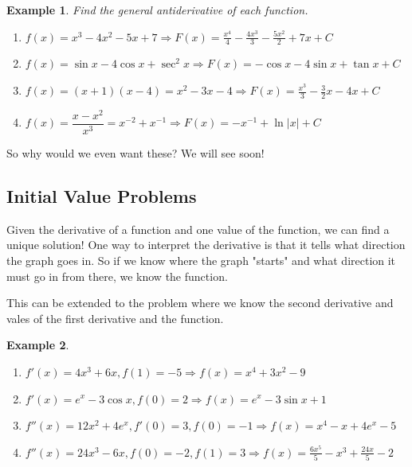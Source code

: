 \documentclass[letterpaper, 11pt, openany]{book}
\theoremstyle{mytheoremstyle}
\theoremstyle{myexamplestyle}
\newtheorem{example}{Example}[section]
\begin{document}
\begin{example}
    Find the general antiderivative of each function.
    \begin{enumerate}
        \item \(f(x) = x^3-4 x^2-5 x+7 \Rightarrow F(x) = \frac{x^4}{4}-\frac{4 x^3}{3}-\frac{5 x^2}{2}+7 x + C \)
        \item \(f(x) = \sin x - 4\cos x + \sec^2 x \Rightarrow F(x) = -\cos x - 4\sin x + \tan x + C\)
        \item \(f(x) = (x+1)(x-4) = x^2 - 3x - 4 \Rightarrow F(x) = \frac{x^3}{3} - \frac{3}{2}x - 4x + C\)
        \item \(f(x) = \dfrac{x - x^2}{x^3} = x^{-2} + x^{-1}\Rightarrow F(x) = -x^{-1} + \ln |x| + C \)
     \end{enumerate}
\end{example}

So why would we even want these? We will see soon!

\subsection{Initial Value Problems}

Given the derivative of a function and one value of the function, we can find a unique solution! One way to interpret the derivative is that it tells what direction the graph goes in. So if we know where the graph "starts" and what direction it must go in from there, we know the function.

This can be extended to the problem where we know the second derivative and vales of the first derivative and the function.

\begin{example}\label{e:antiderivative-ivp}
    \begin{enumerate}
        \item \(f'(x) = 4x^3 + 6x, f(1) = -5 \Rightarrow f(x) = x^4+3 x^2-9\)
        \item \(f'(x) = e^x - 3\cos x, f(0) = 2 \Rightarrow f(x) = e^x-3 \sin x + 1 \)
        \item \(f''(x) = 12x^2 + 4e^{x}, f'(0) = 3, f(0) = -1 \Rightarrow f(x) = x^4-x+4 e^x-5\)
        \item \(f''(x) = 24x^3 - 6x, f(0) = -2, f(1) = 3 \Rightarrow f(x) = \frac{6 x^5}{5}-x^3+\frac{24 x}{5}-2\)
    \end{enumerate}
\end{example}

\newpage\thispagestyle{firstofchapter}
\end{document}
